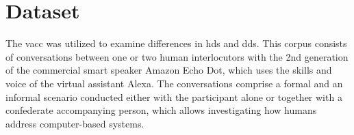 \section{Dataset}
\label{sec:dataset}

The \ac{vacc} \citep{Siegert2018VACC} was utilized to examine differences in \ac{hds} and \ac{dds}.
This corpus consists of conversations between one or two human interlocutors with the 2nd generation of the commercial smart speaker Amazon Echo Dot, which uses the skills and voice of the virtual assistant Alexa.
The conversations comprise a formal and an informal scenario conducted either with the participant alone or together with a confederate accompanying person, which allows investigating how humans address computer-based systems.



